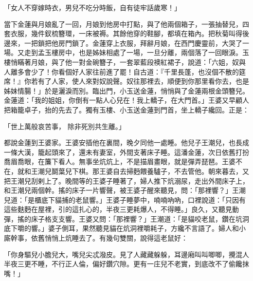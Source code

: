「女人不穿嫁時衣，男兒不吃分時飯，自有徒牢話歲寒！」

當下金蓮與月娘亂了一回，月娘到他房中打點，與了他兩個箱子，一張抽替兒，四套衣服，幾件釵梳簪環，一床被褥。其餘他穿的鞋腳，都填在箱內。把秋菊叫得後邊來，一把鎖把他房門鎖了。金蓮穿上衣服，拜辭月娘，在西門慶靈前，大哭了一場。又走到孟玉樓房中，也是姊妹相處了一場，一旦分離，兩個落了一回眼淚。玉樓悄瞞著月娘，與了他一對金碗簪子，一套翠藍段襖紅裙子，說道：「六姐，奴與人離多會少了！你看個好人家往前進了罷！自古道：『千里長蓬，也沒個不散的筵席！』你若有了人家，使人來對奴說聲。奴往那裡去，順便到你那里看你去，也是姊妹情腸！」於是灑淚而別。臨出門，小玉送金蓮，悄悄與了金蓮兩根金頭簪兒。金蓮道：「我的姐姐，你倒有一點人心兒在！我上轎子，在大門首。」王婆又早顧人把箱籠卓子，抬的先去了。獨有玉樓、小玉送金蓮到門首，坐上轎子纔回。正是：

「世上萬般哀苦事，  除非死別共生離。」

都說金蓮到王婆家。王婆安插他在裏間，晚夕同他一處睡。他兒子王潮兒，也長成一條大漢，籠起頭來了，還未有妻室，外間支著床子睡。這潘金蓮，次日依舊打扮喬眉喬眼，在簾下看人。無事坐炕炕上，不是描眉畫眼，就是彈弄琵琶。王婆不在，就和王潮兒鬬葉兒下棋。那王婆自去掃麪餵養驢子，不去管他。朝來暮去，又把王潮兒刮剌上了。晚間等的王婆子睡著了，婦人推下炕溺尿，走出外間床子上，和王潮兒兩個幹。搖的床子一片響聲，被王婆子醒來聽見，問：「那裡響？」王潮兒道：「是櫃底下貓捕的老鼠響。」王婆子睡夢中，喃喃吶吶，口裡說道：「只因有這些麩麪在屋裡，引的這扎心的，半夜三更耗爆人，不得睡。」良久，又聽見動彈，搖的床子格支支響。王婆又問：「那裡響？」王潮道：「是貓咬老鼠，鑽在坑洞底下嚼的響。」婆子側耳，果然聽見貓在炕洞裡嚼耗子，方纔不言語了。婦人和小廝幹事，依舊悄悄上炕睡去了。有幾句雙關，說得這老鼠好：

「你身驅兒小膽兒大，嘴兒尖忒潑皮。見了人藏藏躲躲，耳邊廂叫叫唧唧，攪混人半夜三更不睡，不行正人倫，偏好鑽穴隙。更有一庄兒不老實，到底改不了偷饞抹嘴！」

